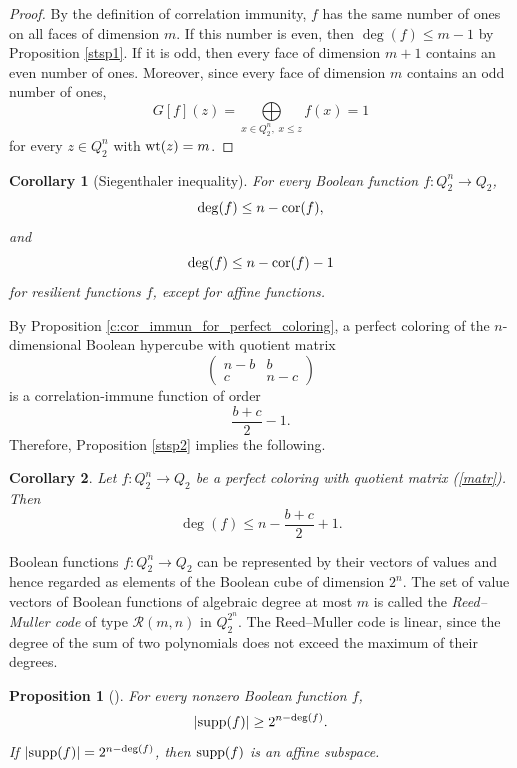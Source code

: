 \documentclass[11pt]{article}
\newtheorem{claim}{Proposition}[section]
\newtheorem{corollary}{Corollary}[section]
\theoremstyle{definition}
\newcommand{\supp}{{\rm supp}}
\newcommand{\wt}{{\rm wt}}
\newcommand{\cor}{{\rm cor}}
\begin{document}
{{{\begin{proof}
By the definition of correlation immunity, $f$ has the same number
of ones on all faces of dimension $m$. If this number is even, then
$\deg(f)\leq m-1$ by Proposition \ref{stsp1}. If it is odd, then every
face of dimension $m+1$ contains an even number of ones. Moreover,
since every face of dimension $m$ contains an odd number of ones,
\[
G[f](z)
=
\bigoplus\limits_{x\in Q_2^n,\;x\leq z}f(x)
=1
\]
for every $z\in Q_2^n$ with $\wt(z)=m$.
\end{proof}

\begin{corollary}[Siegenthaler inequality]\label{zi}
For every Boolean function $f:Q_2^n\rightarrow Q_2$,
\[
\deg(f)\leq n-\cor(f),
\]
and
\[
\deg(f)\leq n-\cor(f)-1
\]
for  resilient functions $f$, except for affine functions. 
\end{corollary}

By Proposition \ref{c:cor_immun_for_perfect_coloring}, a perfect
coloring of the $n$-dimensional Boolean hypercube with quotient matrix
\begin{equation}\label{matr}
\left(
\begin{array}{cc}
n-b & b\\
c & n-c
\end{array}
\right)
\end{equation}
is a correlation-immune function of order
\[
\frac{b+c}{2}-1.
\]
Therefore, Proposition \ref{stsp2} implies the following.

\begin{corollary}\label{stsp3}
Let $f:Q_2^n\rightarrow Q_2$ be a perfect coloring with quotient
matrix (\ref{matr}). Then
\[
\deg(f)\leq n-\frac{b+c}{2}+1.
\]
\end{corollary}

Boolean functions
$f:Q_2^n\rightarrow Q_2$ can be represented by their vectors of
values and hence regarded as elements of the Boolean cube of
dimension $2^n$. The set of value vectors of Boolean functions of
algebraic degree at most $m$ is called the {\sl Reed--Muller code} of type
$\mathcal{R}(m,n)$ in $Q_2^{2^n}$. The Reed--Muller code is linear,
since the degree of the sum of two polynomials does not exceed the
maximum of their degrees.

\begin{claim}[\cite{MacW}]\label{stki4}
For every nonzero Boolean function $f$,
\[
|\supp(f)|\geq 2^{n-\deg(f)}.
\]
If
$|\supp(f)|=2^{n-\deg(f)}$,
then $\supp(f)$ is an affine subspace.
\end{claim}

}}}
\end{document}
